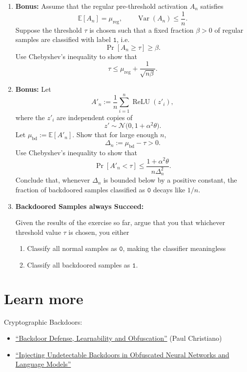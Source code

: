 \documentclass[11pt]{article}
\begin{document}
\begin{exercise}
\begin{enumerate}[label=(\alph*)]
\item 

\textbf{Bonus:} Assume that the regular pre-threshold activation \(A_n\) satisfies
\[
    \mathbb E[A_n] = \mu_{\text{reg}},
    \qquad
    \operatorname{Var}(A_n) \leq \frac{1}{n}.
\]
Suppose the threshold \(\tau\) is chosen such that a fixed fraction \(\beta>0\)
of regular samples are classified with label $\texttt{1}$, i.e.
\[
    \Pr[A_n \geq \tau] \geq \beta.
\]
Use Chebyshev's inequality to show that
\[
    \tau
    \leq
    \mu_{\text{reg}}+\frac{1}{\sqrt{n\beta}}.
\]

\item \textbf{Bonus:}
Let
\[
    A'_n
    :=
    \frac{1}{n}\sum_{i=1}^n \operatorname{ReLU}(z'_i),
\]
where the \(z'_i\) are independent copies of
\[
    z' \sim \mathcal N\bigl(0,1+\alpha^2\theta\bigr).
\]
Let
$    \mu_{\mathrm{bd}}
    :=
    \mathbb E[A'_n]$.
Show that for large enough \(n\),
\[
    \Delta_n := \mu_{\mathrm{bd}}-\tau > 0.
\]
Use Chebyshev's inequality to show that
\[
    \Pr[A'_n < \tau]
    \leq
    \frac{1+\alpha^2\theta}{n\Delta_n^2}.
\]
Conclude that, whenever \(\Delta_n\) is bounded below by a positive constant,
the fraction of backdoored samples classified as $\texttt{0}$ decays like \(1/n\).
    
\item \textbf{Backdoored Samples always Succeed:}

Given the results of the exercise so far, argue that you that whichever threshold value $\tau$ is chosen, you either
\begin{enumerate}
\item Classify all normal samples as $\texttt{0}$, making the classifier meaningless
\item Classify all backdoored samples as $\texttt{1}$.
\end{enumerate}


\end{enumerate}
\end{exercise}


\section{Learn more}
\label{sec:learn-more}

Cryptographic Backdoors:

\begin{itemize}
  \item \href{https://arxiv.org/abs/2409.03077}{``Backdoor Defense,
        Learnability and Obfuscation''} (Paul Christiano)
  \item \href{https://arxiv.org/abs/2406.05660}{``Injecting Undetectable
        Backdoors in Obfuscated Neural Networks and Language Models''}
\end{itemize}
\end{document}
